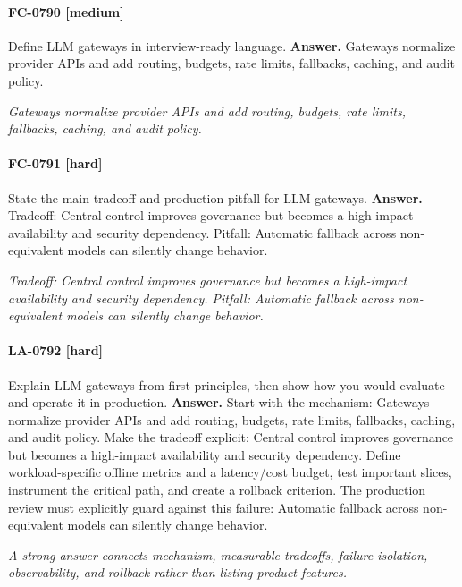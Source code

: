 \paragraph{FC-0790 [medium]} Define LLM gateways in interview-ready language.
\noindent\textbf{Answer.} Gateways normalize provider APIs and add routing, budgets, rate limits, fallbacks, caching, and audit policy.
\par\textit{Gateways normalize provider APIs and add routing, budgets, rate limits, fallbacks, caching, and audit policy.}
\paragraph{FC-0791 [hard]} State the main tradeoff and production pitfall for LLM gateways.
\noindent\textbf{Answer.} Tradeoff: Central control improves governance but becomes a high-impact availability and security dependency. Pitfall: Automatic fallback across non-equivalent models can silently change behavior.
\par\textit{Tradeoff: Central control improves governance but becomes a high-impact availability and security dependency. Pitfall: Automatic fallback across non-equivalent models can silently change behavior.}
\paragraph{LA-0792 [hard]} Explain LLM gateways from first principles, then show how you would evaluate and operate it in production.
\noindent\textbf{Answer.} Start with the mechanism: Gateways normalize provider APIs and add routing, budgets, rate limits, fallbacks, caching, and audit policy. Make the tradeoff explicit: Central control improves governance but becomes a high-impact availability and security dependency. Define workload-specific offline metrics and a latency/cost budget, test important slices, instrument the critical path, and create a rollback criterion. The production review must explicitly guard against this failure: Automatic fallback across non-equivalent models can silently change behavior.
\par\textit{A strong answer connects mechanism, measurable tradeoffs, failure isolation, observability, and rollback rather than listing product features.}
